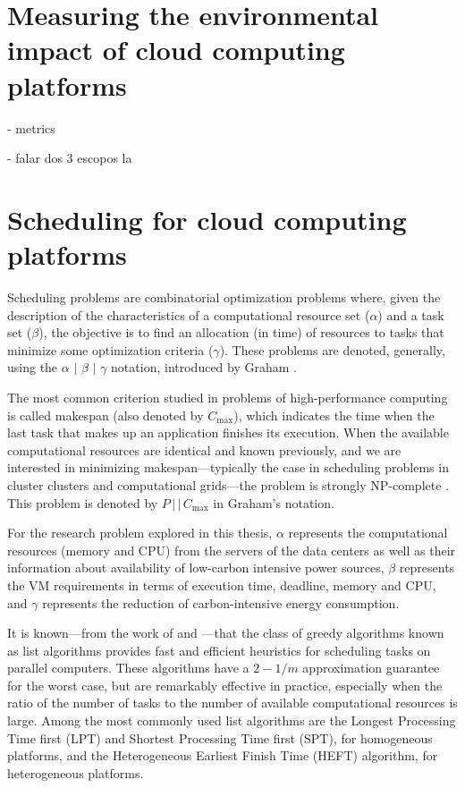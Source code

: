 \section{Measuring the environmental impact of cloud computing platforms}

- metrics

- falar dos 3 escopos la 


\section{Scheduling for cloud computing platforms}
\label{sec:scheduling_cloud}

Scheduling problems are combinatorial optimization problems where, given the description of the characteristics of a computational resource set ($\alpha$) and a task set ($\beta$), the objective is to find an allocation (in time) of resources to tasks that minimize some optimization criteria ($\gamma$). These problems are denoted, generally, using the $\alpha$ $\vert$ $\beta$ $\vert$ $\gamma$ notation, introduced by Graham \citep{graham}. 

The most common criterion studied in problems of high-performance computing is called makespan (also denoted by $C_{\max}$), which indicates the time when the last task that makes up an application finishes its execution. When the available computational resources are identical and known previously, and we are interested in minimizing makespan---typically the case in scheduling problems in cluster clusters and computational grids---the problem is strongly NP-complete \citep{Garey}. This problem is denoted by $P\,\vert\,\vert\,C_{\max}$ in Graham's notation.

For the research problem explored in this thesis, $\alpha$ represents the computational resources (memory and CPU) from the servers of the data centers as well as their information about availability of low-carbon intensive power sources, $\beta$ represents the VM requirements in terms of execution time,  deadline, memory and CPU, and $\gamma$ represents the reduction of carbon-intensive energy consumption.

It is known---from the work of \citet {graham} and \citet {Garey}---that the class of greedy algorithms known as list algorithms provides fast and efficient heuristics for scheduling tasks on parallel computers. These algorithms have a $2 -1 /m$ approximation guarantee for the worst case, but are remarkably effective in practice, especially when the ratio of the number of tasks to the number of available computational resources is large. Among the most commonly used list algorithms are the Longest Processing Time first (LPT) and Shortest Processing Time first (SPT),  for homogeneous platforms, and the Heterogeneous Earliest Finish Time (HEFT) algorithm, for heterogeneous platforms.


